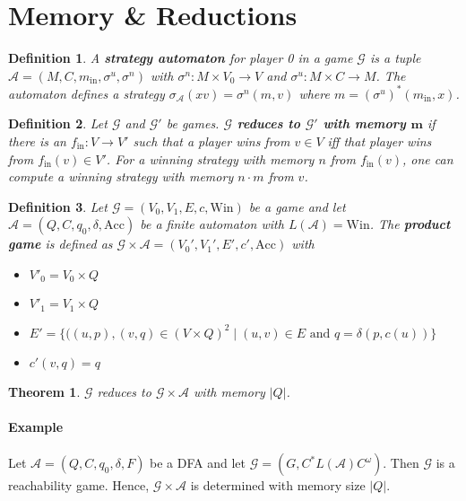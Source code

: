 \documentclass{article}
\newtheorem{theorem}{Theorem}
\newtheorem{definition}{Definition}
\begin{document}
\newpage

\section{Memory \& Reductions}
\begin{definition}
	A \textbf{strategy automaton} for player 0 in a game $\mathcal{G}$ is a tuple $\mathcal{A} = (M, C, m_\text{in}, \sigma^u, \sigma^n)$ with $\sigma^n : M \times V_0 \rightarrow V$ and $\sigma^u : M \times C \rightarrow M$. The automaton defines a strategy $\sigma_\mathcal{A}(xv) = \sigma^n(m, v)$ where $m = (\sigma^u)^*(m_\text{in}, x)$.
\end{definition}

\begin{definition}
	Let $\mathcal{G}$ and $\mathcal{G}'$ be games. \textbf{$\boldsymbol{\mathcal{G}}$ reduces to $\boldsymbol{\mathcal{G}'}$ with memory $\boldsymbol{m}$} if there is an $f_\text{in} : V \rightarrow V'$ such that a player wins from $v \in V$ iff that player wins from $f_\text{in}(v) \in V'$. For a winning strategy with memory $n$ from $f_\text{in}(v)$, one can compute a winning strategy with memory $n \cdot m$ from $v$.
\end{definition}

\begin{definition}
	Let $\mathcal{G} = (V_0, V_1, E, c, \text{Win})$ be a game and let $\mathcal{A} = (Q, C, q_0, \delta, \text{Acc})$ be a finite automaton with $L(\mathcal{A}) = \text{Win}$. The \textbf{product game} is defined as $\mathcal{G} \times \mathcal{A} = (V_0', V_1', E', c', \text{Acc})$ with
	\begin{itemize}
		\item $V'_0 = V_0 \times Q$
		\item $V'_1 = V_1 \times Q$
		\item $E' = \{ ((u, p), (v, q) \in (V \times Q)^2 \mid (u,v) \in E \text{ and } q = \delta(p, c(u)) \}$
		\item $c'(v, q) = q$
	\end{itemize}
\end{definition}

\begin{theorem}
	$\mathcal{G}$ reduces to $\mathcal{G} \times \mathcal{A}$ with memory $|Q|$.
\end{theorem}

\paragraph{Example}
	Let $\mathcal{A} = (Q, C, q_0, \delta, F)$ be a DFA and let $\mathcal{G} = (G, C^* L(\mathcal{A}) C^\omega)$. Then $\mathcal{G}$ is a reachability game. Hence, $\mathcal{G} \times \mathcal{A}$ is determined with memory size $|Q|$.
\end{document}
